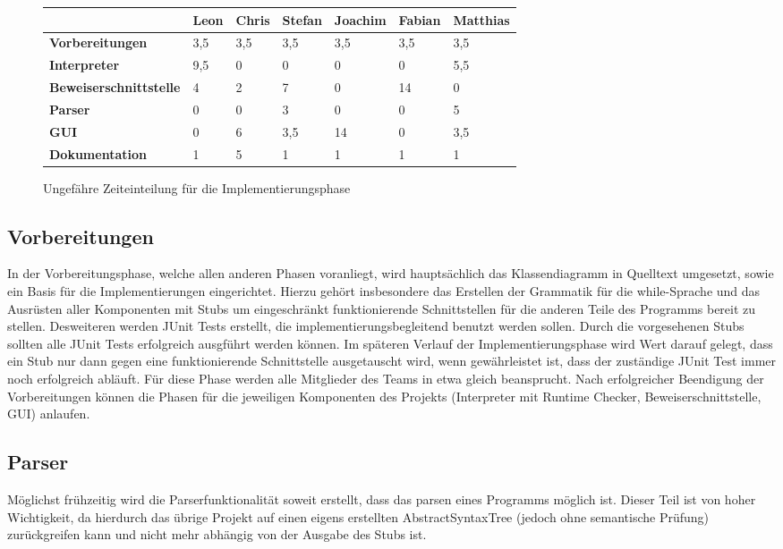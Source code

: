\begin{figure}[H]
\caption[B]{Ungefähre Zeiteinteilung für die Implementierungsphase}
\label{timeplan}
\begin{tabular}{|l|l|l|l|l|l|l|}

\hline
 & \textbf{Leon} & \textbf{Chris} & \textbf{Stefan} & \textbf{Joachim} & \textbf{Fabian} & \textbf{Matthias} \\
\hline
\textbf{Vorbereitungen} & 3,5 & 3,5 & 3,5 & 3,5 & 3,5 & 3,5 \\
\hline
\textbf{Interpreter} & 9,5 & 0 & 0 & 0 & 0 & 5,5 \\
\hline
\textbf{Beweiserschnittstelle} & 4 & 2 & 7 & 0 & 14 & 0 \\
\hline
\textbf{Parser} & 0 & 0 & 3 & 0 & 0 & 5 \\
\hline
\textbf{GUI} & 0 & 6 & 3,5 & 14 & 0 & 3,5 \\
\hline
\textbf{Dokumentation} & 1 & 5 & 1 & 1 & 1 & 1 \\
\hline
\end{tabular}
\end{figure}

\subsection{Vorbereitungen}
In der Vorbereitungsphase, welche allen anderen Phasen voranliegt, wird hauptsächlich das Klassendiagramm in Quelltext umgesetzt, sowie ein Basis für die Implementierungen eingerichtet. Hierzu gehört insbesondere das Erstellen der Grammatik für die while-Sprache und das Ausrüsten aller Komponenten mit Stubs um eingeschränkt funktionierende Schnittstellen für die anderen Teile des Programms bereit zu stellen. Desweiteren werden JUnit Tests erstellt, die implementierungsbegleitend benutzt werden sollen. Durch die vorgesehenen Stubs sollten alle JUnit Tests erfolgreich ausgführt werden können. Im späteren Verlauf der Implementierungsphase wird Wert darauf gelegt, dass ein Stub nur dann gegen eine funktionierende Schnittstelle ausgetauscht wird, wenn gewährleistet ist, dass der zuständige JUnit Test immer noch erfolgreich abläuft. Für diese Phase werden alle Mitglieder des Teams in etwa gleich beansprucht. Nach erfolgreicher Beendigung der Vorbereitungen können die Phasen für die jeweiligen Komponenten des Projekts (Interpreter mit Runtime Checker, Beweiserschnittstelle, GUI) anlaufen.

\subsection{Parser}
Möglichst frühzeitig wird die Parserfunktionalität soweit erstellt, dass das parsen eines Programms möglich ist. Dieser Teil ist von hoher Wichtigkeit, da hierdurch das übrige Projekt auf einen eigens erstellten AbstractSyntaxTree (jedoch ohne semantische Prüfung) zurückgreifen kann und nicht mehr abhängig von der Ausgabe des Stubs ist.

